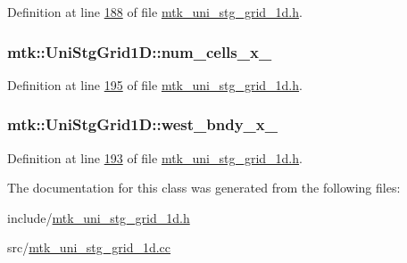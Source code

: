 Definition at line \hyperlink{mtk__uni__stg__grid__1d_8h_source_l00188}{188} of file \hyperlink{mtk__uni__stg__grid__1d_8h_source}{mtk\+\_\+uni\+\_\+stg\+\_\+grid\+\_\+1d.\+h}.

\hypertarget{classmtk_1_1UniStgGrid1D_afa43750db0029b7454aef343759e7097}{
\subsubsection[{num\+\_\+cells\+\_\+x\+\_\+}]{ mtk\+::\+Uni\+Stg\+Grid1\+D\+::num\+\_\+cells\+\_\+x\+\_\+\hspace{0.3cm}{\ttfamily [private]}}}\label{classmtk_1_1UniStgGrid1D_afa43750db0029b7454aef343759e7097}


Definition at line \hyperlink{mtk__uni__stg__grid__1d_8h_source_l00195}{195} of file \hyperlink{mtk__uni__stg__grid__1d_8h_source}{mtk\+\_\+uni\+\_\+stg\+\_\+grid\+\_\+1d.\+h}.

\hypertarget{classmtk_1_1UniStgGrid1D_a6910438d3396d0b9a130d11d16979c46}{
\subsubsection[{west\+\_\+bndy\+\_\+x\+\_\+}]{ mtk\+::\+Uni\+Stg\+Grid1\+D\+::west\+\_\+bndy\+\_\+x\+\_\+\hspace{0.3cm}{\ttfamily [private]}}}\label{classmtk_1_1UniStgGrid1D_a6910438d3396d0b9a130d11d16979c46}


Definition at line \hyperlink{mtk__uni__stg__grid__1d_8h_source_l00193}{193} of file \hyperlink{mtk__uni__stg__grid__1d_8h_source}{mtk\+\_\+uni\+\_\+stg\+\_\+grid\+\_\+1d.\+h}.



The documentation for this class was generated from the following files\+:\begin{DoxyCompactItemize}
\item 
include/\hyperlink{mtk__uni__stg__grid__1d_8h}{mtk\+\_\+uni\+\_\+stg\+\_\+grid\+\_\+1d.\+h}\item 
src/\hyperlink{mtk__uni__stg__grid__1d_8cc}{mtk\+\_\+uni\+\_\+stg\+\_\+grid\+\_\+1d.\+cc}\end{DoxyCompactItemize}
